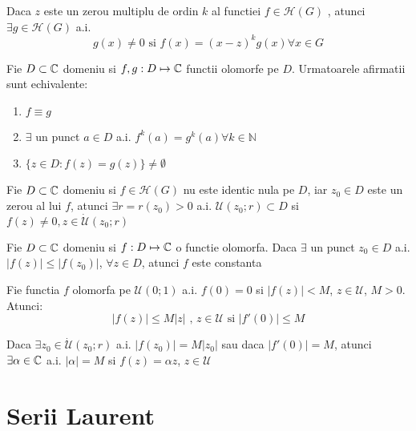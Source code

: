 \begin{theorem}
    Daca $z$ este un zerou multiplu de ordin $k$ al functiei $f \in \mathcal{H}(G)$ , atunci
    $\exists g \in \mathcal{H}(G)$ a.i.
    \[
        g(x) \neq 0 \text{ si }  f(x) = (x-z)^k g(x) \forall x \in G
    \]
\end{theorem}

\begin{theorem}
    Fie $D \subset \mathbb{C}$ domeniu si $f,g : D\mapsto \mathbb{C}$ functii olomorfe pe $D$. Urmatoarele afirmatii
    sunt echivalente:
    \begin{enumerate}
        \item $f \equiv g$
        \item $\exists$ un punct $a\in D$ a.i. $f^{k}(a) = g^{k}(a) \forall k \in \mathbb{N}$
        \item $ \{z \in D \colon f(z) = g(z)\} \neq \emptyset$
    \end{enumerate}
\end{theorem}

\begin{theorem}
    Fie $D \subset \mathbb{C}$ domeniu si $f\in \mathcal{H}(G)$ nu este identic nula pe $D$, iar $z_0 \in D$
    este un zerou al lui $f$, atunci $\exists r=r(z_0)>0$  a.i. $\mathcal{U}(z_0;r) \subset D $
    si $f(z) \neq 0, z\in \dot{\mathcal{U}}(z_0;r)$
\end{theorem}

\begin{theorem}
    Fie $D \subset \mathbb{C}$ domeniu si $f:D\mapsto \mathbb{C}$ o functie olomorfa. Daca $\exists$ un punct
    $z_0 \in D$ a.i. $|f(z)| \leq |f(z_0)|$, $\forall z \in D $, atunci $f$ este constanta
\end{theorem}

\begin{theorem}
    Fie functia $f$ olomorfa pe $\mathcal{U}(0;1)$ a.i. $f(0) = 0$ si $|f(z)| < M$,
    $z\in \mathcal{U}$, $M>0$. Atunci:
    \[
        |f(z)| \leq M |z| \text{ , } z \in \mathcal{U} \text{ si } |f'(0)| \leq M
    \]

    Daca $\exists z_0 \in \dot{\mathcal{U}}(z_0;r)$ a.i. $|f(z_0)| = M |z_0| $ sau daca
    $|f'(0)| = M$, atunci $\exists \alpha \in \mathbb{C} $ a.i. $|\alpha| = M $ si $f(z) = \alpha z$,
    $z \in \mathcal{U}$
\end{theorem}

\section{Serii Laurent}

